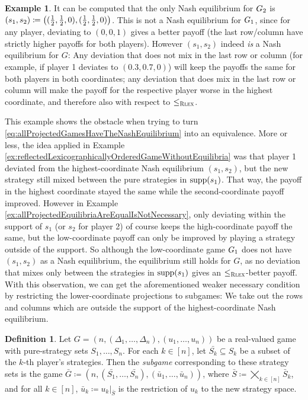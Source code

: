 \documentclass[a4paper,DIV=11,abstracton,twoside=semi]{scrreprt}
\theoremstyle{definition}
\newtheorem{defn}[thm]{Definition} %
\newtheorem{ex}[thm]{Example} %
\begin{document}
\begin{ex}
        It can be computed that the only Nash equilibrium for $G_{2}$ is $(s_1, s_2) \coloneqq \bigl((\frac{1}{2}, \frac{1}{2}, 0), (\frac{1}{2}, \frac{1}{2}, 0)\bigr)$.
        This is not a Nash equilibrium for $G_{1}$, since for any player, deviating to $(0, 0, 1)$ gives a better payoff (the last row/column have strictly higher payoffs for both players).
        However $(s_1, s_2)$ indeed \emph{is} a Nash equilibrium for $G$:
        Any deviation that does not mix in the last row or column (for example, if player 1 deviates to $(0.3, 0.7, 0)$) will keep the payoffs the same for both players in both coordinates; any deviation that does mix in the last row or column will make the payoff for the respective player worse in the highest coordinate, and therefore also with respect to $\leq_{\textsc{Rlex}}$.
    \end{ex}

    This example shows the obstacle when trying to turn \eqref{eq:allProjectedGamesHaveTheNashEquilibrium} into an equivalence.
    More or less, the idea applied in Example \ref{ex:reflectedLexicographicallyOrderedGameWithoutEquilibria} was that player 1 deviated from the highest-coordinate Nash equilibrium $(s_1, s_2)$, but the new strategy still mixed between the pure strategies in $\operatorname{supp}(s_1)$. That way, the payoff in the highest coordinate stayed the same while the second-coordinate payoff improved.
    However in Example \ref{ex:allProjectedEquilibriaAreEqualIsNotNecessary}, only deviating within the support of $s_1$ (or $s_2$ for player 2) of course keeps the high-coordinate payoff the same, but the low-coordinate payoff can only be improved by playing a strategy outside of the support.
    So although the low-coordinate game $G_{1}$ does not have $(s_1, s_2)$ as a Nash equilibrium, the equilibrium still holds for $G$, as no deviation that mixes only between the strategies in $\operatorname{supp}(s_1)$ gives an $\leq_{\textsc{Rlex}}$-better payoff.
    With this observation, we can get the aforementioned weaker necessary condition by restricting the lower-coordinate projections to subgames: We take out the rows and columns which are outside the support of the highest-coordinate Nash equilibrium.
    
    \begin{defn}
        Let $G = (n, (\Delta_1, \dots, \Delta_n), (u_1, \dots, u_n))$ be a real-valued game with pure-strategy sets $S_1, \dots, S_n$. For each $k \in [n]$, let $\bar{S_k} \subseteq S_k$ be a subset of the $k$-th player's strategies. Then the \emph{subgame} corresponding to these strategy sets is the game $\bar{G} \coloneqq (n, (\bar{S_1}, \dots, \bar{S_n}), (\bar{u}_1, \dots, \bar{u}_n))$, where $\bar{S} \coloneqq \bigtimes_{k \in [n]} \bar{S}_k$, and for all $k \in [n]$, $\bar{u}_k \coloneqq u_k\vert_{\bar{S}}$ is the restriction of $u_k$ to the new strategy space.
    \end{defn}
\end{document}
